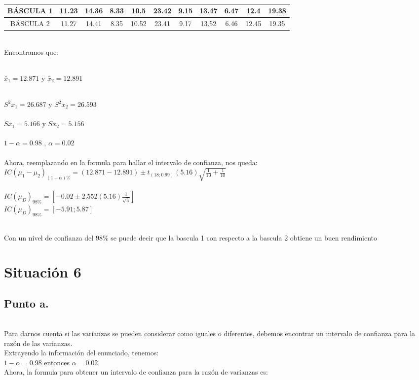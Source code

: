 \documentclass[letterpaper,12pt,onecolumn,titlepage]{article}
\begin{document}
~\\ \begin{center}
 \begin{tabular}{|c|c|c|c|c|c|c|c|c|c|c|}
\hline 
\rule[-1ex]{0pt}{2.5ex} B\'{A}SCULA 1 & 11.23 & 14.36 & 8.33 & 10.5 & 23.42 & 9.15 & 13.47 & 6.47 & 12.4 & 19.38 \\ 
\hline 
\rule[-1ex]{0pt}{2.5ex} B\'{A}SCULA 2 & 11.27 & 14.41 & 8.35 & 10.52 & 23.41 & 9.17 & 13.52 & 6.46 & 12.45 & 19.35 \\ 
\hline 

\end{tabular} 
\end{center}

~\\ Encontramos que: 

~\\$\bar{x}_{1}=12.871$ y $\bar{x}_{2}=12.891$

~\\$S^2{x}_{1}=26.687$ y $S^2{x}_{2}=26.593$\\
~\\$S{x}_{1}=5.166$ y $S{x}_{2}=5.156$\\
~\\ $1-\alpha=0.98$ ,  $\alpha= 0.02$\\

~\\ Ahora, reemplazando en la formula para hallar el intervalo de confianza, nos queda:
~\\ $IC(\mu_{1}-\mu_{2} )_{(1-\alpha)\%}=( 12.871 - 12.891) \pm t_{(18 ;0.99)}(5.16)\sqrt{\frac{1}{10}+\frac{1}{10}}$ \\
~\\ $IC(\mu_{D})_{98\%}=[-0.02 \pm 2.552 (5.16) \frac{1}{\sqrt{5}}]$
~\\ $IC(\mu_{D})_{98\%}=[-5.91 ; 5.87 ]$

~\\ Con un nivel de confianza del $98\%$ se puede decir que la bascula 1 con respecto a la bascula 2 obtiene un buen rendimiento 


\pagebreak\section{Situaci\'{o}n 6}
\subsection{Punto a.}
~\\ Para darnos cuenta si las varianzas se pueden considerar como iguales o diferentes, debemos encontrar un intervalo de confianza para la raz\'{o}n de las varianzas.
~\\ Extrayendo la informaci\'{o}n del enunciado, tenemos:
~\\ $1-\alpha=0.98$ entonces $\alpha=0.02$
~\\ Ahora, la formula para obtener un intervalo de confianza para la raz\'{o}n de varianzas es:
\end{document}
